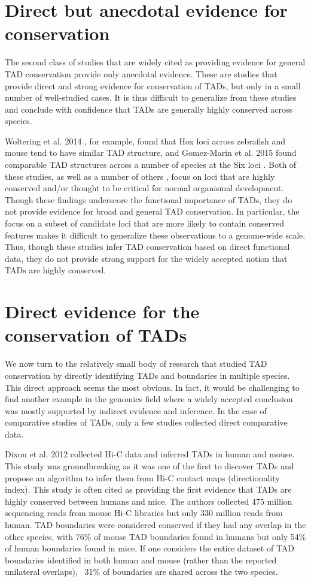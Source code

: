 \section{Direct but anecdotal evidence for conservation}
The second class of studies that are widely cited as providing evidence for general TAD conservation provide only anecdotal evidence. These are studies that provide direct and strong evidence for conservation of TADs, but only in a small number of well-studied cases. It is thus difficult to generalize from these studies and conclude with confidence that TADs are generally highly conserved across species.

Woltering et al. 2014 \cite{Woltering.2014}, for example, found that Hox loci across zebrafish and mouse tend to have similar TAD structure, and Gomez-Marin et al. 2015 found comparable TAD structures across a number of species at the Six loci \cite{Gomez-marin.2015}. Both of these studies, as well as a number of others \cite{Smith.2016, Lupianez.2015, Galupa.2018, Galupa.2020}, focus on loci that are highly conserved and/or thought to be critical for normal organismal development. Though these findings underscore the functional importance of TADs, they do not provide evidence for broad and general TAD conservation. In particular, the focus on a subset of candidate loci that are more likely to contain conserved features makes it difficult to generalize these observations to a genome-wide scale. Thus, though these studies infer TAD conservation based on direct functional data, they do not provide strong support for the widely accepted notion that TADs are highly conserved. 

\section{Direct evidence for the conservation of TADs}
We now turn to the relatively small body of research that studied TAD conservation by directly identifying TADs and boundaries in multiple species. This direct approach seems the most obvious. In fact, it would be challenging to find another example in the genomics field where a widely accepted conclusion was mostly supported by indirect evidence and inference. In the case of comparative studies of TADs, only a few studies collected direct comparative data.

Dixon et al. 2012 \cite{Dixon.2012} collected Hi-C data and inferred TADs in human and mouse. This study was groundbreaking as it was one of the first to discover TADs and propose an algorithm to infer them from Hi-C contact maps (directionality index). This study is often cited as providing the first evidence that TADs are highly conserved between humans and mice. The authors collected 475 million sequencing reads from mouse Hi-C libraries but only 330 million reads from human. TAD boundaries were considered conserved if they had any overlap in the other species, with 76\% of mouse TAD boundaries found in humans but only 54\% of human boundaries found in mice. If one considers the entire dataset of TAD boundaries identified in both human and mouse (rather than the reported unilateral overlaps), ~31\% of boundaries are shared across the two species.


